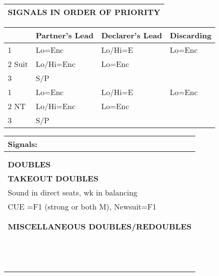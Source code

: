 \documentclass{article}
\begin{document}
\begin{minipage}{90mm}
\begin{tabular}{| p{88mm} |}
		\textbf{SIGNALS IN ORDER OF PRIORITY} \\ \hline
	\end{tabular}
	\begin{tabular}{| p{8.9mm} | p{22mm} | p{22mm} | p{22mm} |}
		& Partner's Lead & Declarer's Lead & Discarding \\ \hline
		1 &Lo=Enc & Lo/Hi=E & Lo=Enc \\ \hline
		2 Suit &Lo/Hi=Enc & Lo=Enc & \\ \hline
		3 &S/P & & \\ \hline
		1 &Lo=Enc & Lo/Hi=E & Lo=Enc \\ \hline
		2 NT &Lo/Hi=Enc & Lo=Enc & \\ \hline
		3 &S/P & & \\ \hline
	\end{tabular}
	\begin{tabular}{| p{88mm} |}
		Signals: \\ \hline
		\\ \hline
		\\ \hline \hline
		\cellcolor[gray]{0.9} \textbf{DOUBLES} \\ \hline
		\textbf{TAKEOUT DOUBLES} \\ \hline
                Sound in direct seats, wk in balancing
		\\ \hline
                CUE =F1 (strong or both M), Newsuit=F1
		\\ \hline
		\\ \hline
		\\ \hline
		\textbf{MISCELLANEOUS DOUBLES/REDOUBLES} \\ \hline
		\\ \hline
		\\ \hline
		\\ \hline
		\\ \hline
		\\ \hline
		\\ \hline
		\\ \hline
		\\ \hline
		\\ \hline
		\\ \hline
		\\ \hline
		\\ \hline
		\\ \hline
	\end{tabular}
\end{minipage}
\begin{minipage}{5mm}
	\begin{tabular}{| p{5mm} |}
	\end{tabular}
\end{minipage}
\end{document}
